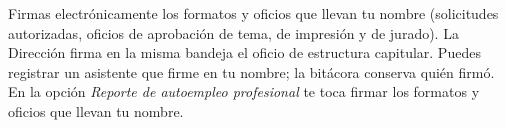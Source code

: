 \documentclass[11pt,a4paper]{article}
\begin{document}
{\small\tableofcontents}
\newpage
\begin{quevasahacer}
Firmas electrónicamente los formatos y oficios que llevan tu nombre (solicitudes autorizadas, oficios de aprobación de tema, de impresión y de jurado). La Dirección firma en la misma bandeja el oficio de estructura capitular. Puedes registrar un asistente que firme en tu nombre; la bitácora conserva quién firmó. En la opción \emph{Reporte de autoempleo profesional} te toca firmar los formatos y oficios que llevan tu nombre.
\end{quevasahacer}



\end{document}

